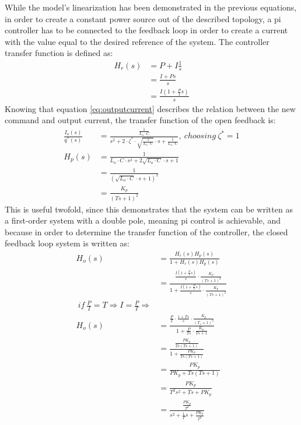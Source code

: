 While the model's linearization has been demonstrated in the previous equations, in order to create a constant power source out of the described topology, a \gls{pi} controller has to be connected to the feedback loop in order to create a current with the value equal to the desired reference of the system.
The controller transfer function is defined as:
\begin{equation}
    \begin{split}
        H_r(s) &= P + I \frac{1}{s} \\
        &= \frac{I + Ps}{s} \\
        &= \frac{I\left(1 + \frac{P}{I}s\right)}{s}
    \end{split}
\end{equation}
Knowing that equation \eqref{eq:outputcurrent} describes the relation between the new command and output current, the transfer function of the open feedback is:
\begin{equation}
    \begin{split}
        \frac{I_o(s)}{q^*(s)} &= \frac{\frac{1}{L_o \cdot C}}{s^2 + 2 \cdot \zeta^* \cdot \sqrt{\frac{1}{L_o \cdot C}} \cdot s + \frac{1}{L_o \cdot C}},\ choosing \ \zeta^* = 1 \\
        H_p(s) &= \frac{1}{L_o \cdot C \cdot s^2 + 2 \sqrt{L_o \cdot C} \cdot s + 1} \\
        &= \frac{1}{(\sqrt{L_o \cdot C} \cdot s + 1)^2} \\
        &= \frac{K_p}{(Ts + 1)^2}
    \end{split}
\end{equation}
This is useful twofold, since this demonstrates that the system can be written as a first-order system with a double pole, meaning \gls{pi} control is achievable, and because in order to determine the transfer function of the controller, the closed feedback loop system is written as:
\begin{equation}
    \begin{split}
        H_o(s) &= \frac{H_r(s) H_p(s)}{1 + H_r(s) H_p(s)} \\
        &= \frac{\frac{I\left(1 + \frac{P}{I}s\right)}{s} \cdot \frac{K_p}{(Ts + 1)^2}}{ 1 + \frac{I\left(1 + \frac{P}{I}s\right)}{s} \cdot \frac{K_p}{(Ts + 1)^2}} \\
        \ if \ \frac{P}{I} = T \Rightarrow I = \frac{P}{T} \Rightarrow \\
        H_o(s) &= \frac{\frac{P}{T} \cdot \frac{1 + Ts}{s} \cdot \frac{K_p}{(T_s + 1)^2}}{1 + \frac{P}{Ts} \cdot \frac{K_p}{Ts + 1}} \\
        &= \frac{\frac{P K_p}{Ts (Ts + 1)}}{1 + \frac{P K_p}{Ts (Ts + 1)}} \\
        &= \frac{P K_p}{P K_p + Ts(Ts + 1)} \\
        &= \frac{P K_p}{T^2 s^2 + T s + P K_p} \\
        &= \frac{\frac{P K_p}{T^2}}{s^2 + \frac{1}{T}s + \frac{P K_p}{T^2}} \\
    \end{split}
\end{equation}
